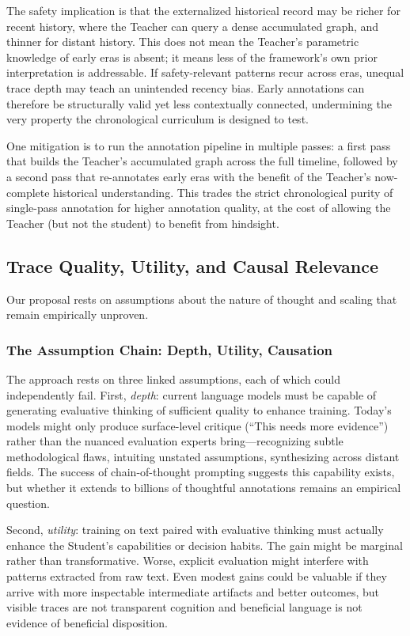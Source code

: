 The safety implication is that the externalized historical record may be richer
for recent history, where the Teacher can query a dense accumulated graph, and
thinner for distant history. This does not mean the Teacher's parametric
knowledge of early eras is absent; it means less of the framework's own prior
interpretation is addressable. If safety-relevant patterns recur across eras,
unequal trace depth may teach an unintended recency bias. Early annotations can
therefore be structurally valid yet less contextually connected, undermining the
very property the chronological curriculum is designed to test.

One mitigation is to run the annotation pipeline in multiple passes: a first pass that builds the Teacher's accumulated graph across the full timeline, followed by a second pass that re-annotates early eras with the benefit of the Teacher's now-complete historical understanding. This trades the strict chronological purity of single-pass annotation for higher annotation quality, at the cost of allowing the Teacher (but not the student) to benefit from hindsight.


\subsection{Trace Quality, Utility, and Causal Relevance}

Our proposal rests on assumptions about the nature of thought and scaling that remain empirically unproven.

\subsubsection{The Assumption Chain: Depth, Utility, Causation}

The approach rests on three linked assumptions, each of which could independently fail. First, \emph{depth}: current language models must be capable of generating evaluative thinking of sufficient quality to enhance training. Today's models might only produce surface-level critique (``This needs more evidence'') rather than the nuanced evaluation experts bring---recognizing subtle methodological flaws, intuiting unstated assumptions, synthesizing across distant fields. The success of chain-of-thought prompting suggests this capability exists, but whether it extends to billions of thoughtful annotations remains an empirical question.

Second, \emph{utility}: training on text paired with evaluative thinking must
actually enhance the Student's capabilities or decision habits. The gain might
be marginal rather than transformative. Worse, explicit evaluation might
interfere with patterns extracted from raw text. Even modest gains could be
valuable if they arrive with more inspectable intermediate artifacts and better
outcomes, but visible traces are not transparent cognition and beneficial
language is not evidence of beneficial disposition.

